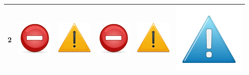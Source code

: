 \documentclass[12pt]{article}
\begin{document}
\begin{center}
\begin{tabular}{*{6}{|c}|}
    2 & \includegraphics[scale=0.2]{Billeder/kritisk} & \includegraphics[scale=0.2]{Billeder/alvorligt} & \includegraphics[scale=0.2]{Billeder/kritisk} & \includegraphics[scale=0.2]{Billeder/alvorligt} & \includegraphics[scale=0.1]{Billeder/mindre}  \\
        \hline

\end{tabular}
\end{center}
\end{document}
